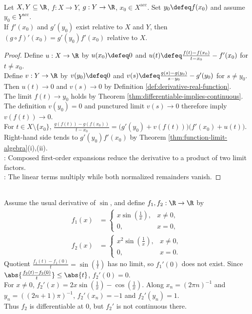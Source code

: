 \begin{theorem} \label{thm:chain-rule-one-variable} \\
Let $X,Y\subseteq\R$, $f:X\to Y$, $g:Y\to\R$, $x_0\in X^{\operatorname{acc}}$. Set $y_0\defeq f(x_0)$ and assume $y_0\in Y^{\operatorname{acc}}$.\\
If $f'(x_0)$ and $g'(y_0)$ exist relative to $X$ and $Y$, then $(g\circ f)'(x_0)=g'(y_0)f'(x_0)$ relative to $X$.
\begin{proof}
Define $u:X\to\R$ by $u(x_0)\defeq0$ and $u(t)\defeq\frac{f(t)-f(x_0)}{t-x_0}-f'(x_0)$ for $t\neq x_0$.\\
Define $v:Y\to\R$ by $v(y_0)\defeq0$ and $v(s)\defeq\frac{g(s)-g(y_0)}{s-y_0}-g'(y_0)$ for $s\neq y_0$. Then $u(t)\to0$ and $v(s)\to0$ by Definition \ref{def:derivative-real-function}.\\
The limit $f(t)\to y_0$ holds by Theorem \ref{thm:differentiable-implies-continuous}. The definition $v(y_0)=0$ and punctured limit $v(s)\to0$ therefore imply $v(f(t))\to0$.\\
For $t\in X\setminus\{x_0\}$, $\frac{g(f(t))-g(f(x_0))}{t-x_0}=\bigl(g'(y_0)+v(f(t))\bigr)\bigl(f'(x_0)+u(t)\bigr)$. Right-hand side tends to $g'(y_0)f'(x_0)$ by Theorem \ref{thm:function-limit-algebra}(i),(ii).\\
: Composed first-order expansions reduce the derivative to a product of two limit factors.\\
: The linear terms multiply while both normalized remainders vanish.
\end{proof}
\end{theorem}

\begin{example} \label{ex:oscillatory-derivative-examples} \\
Assume the usual derivative of $\sin$, and define $f_1,f_2:\R\to\R$ by
\begin{align*}
f_1(x)&=
\begin{cases}
x\sin(\frac{1}{x}),&x\neq0,\\
0,&x=0,
\end{cases}\\
f_2(x)&=
\begin{cases}
x^2\sin(\frac{1}{x}),&x\neq0,\\
0,&x=0.
\end{cases}
\end{align*}
Quotient $\frac{f_1(t)-f_1(0)}{t}=\sin(\frac{1}{t})$ has no limit, so $f_1'(0)$ does not exist. Since $\abs{\frac{f_2(t)-f_2(0)}{t}}\leq\abs{t}$, $f_2'(0)=0$.\\
For $x\neq0$, $f_2'(x)=2x\sin(\frac{1}{x})-\cos(\frac{1}{x})$. Along $x_n=(2\pi n)^{-1}$ and $y_n=((2n+1)\pi)^{-1}$, $f_2'(x_n)=-1$ and $f_2'(y_n)=1$.\\
Thus $f_2$ is differentiable at $0$, but $f_2'$ is not continuous there.
\end{example}

